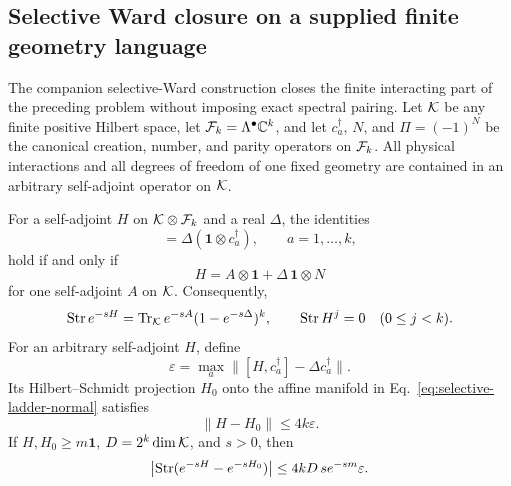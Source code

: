 \subsection{Selective Ward closure on a supplied finite geometry language}
\label{sec:selective-ward-closure}

The companion selective-Ward construction
\cite{XuSelectiveLadderWard2026} closes the finite interacting part of the
preceding problem without imposing exact spectral pairing.  Let
\(\mathcal K\) be any finite positive Hilbert space, let
\(\mathcal F_k=\Lambda^\bullet\mathbb C^k\), and let \(c_a^\dagger\), \(N\), and
\(\Pi=(-1)^N\) be the canonical creation, number, and parity operators on
\(\mathcal F_k\).  All physical interactions and all degrees of freedom of one
fixed geometry are contained in an arbitrary self-adjoint operator on
\(\mathcal K\).

\begin{theorem}
\label{thm:selective-ladder-closure}
For a self-adjoint \(H\) on \(\mathcal K\otimes\mathcal F_k\) and a real
\(\Delta\), the identities
\begin{equation}
 [H,\mathbf1\otimes c_a^\dagger]
 =\Delta(\mathbf1\otimes c_a^\dagger),
 \qquad a=1,\ldots,k,
 \label{eq:selective-ladder-ward}
\end{equation}
hold if and only if
\begin{equation}
 H=A\otimes\mathbf1+\Delta\,\mathbf1\otimes N
 \label{eq:selective-ladder-normal}
\end{equation}
for one self-adjoint \(A\) on \(\mathcal K\).  Consequently,
\begin{equation}
 \operatorname{Str} e^{-sH}=\operatorname{Tr}_\mathcal K e^{-sA}(1-e^{-s\Delta})^k,
 \qquad
 \operatorname{Str} H^j=0\quad(0\leq j<k).
 \label{eq:selective-heat}
\end{equation}
For an arbitrary self-adjoint \(H\), define
\[
 \varepsilon=\max_a
 \|[H,c_a^\dagger]-\Delta c_a^\dagger\|.
\]
Its Hilbert--Schmidt projection \(H_0\) onto the affine manifold
in Eq.~\eqref{eq:selective-ladder-normal} satisfies
\begin{equation}
 \|H-H_0\|\leq4k\varepsilon.
 \label{eq:selective-distance}
\end{equation}
If \(H,H_0\geq m\mathbf1\), \(D=2^k\dim\mathcal K\), and \(s>0\), then
\begin{equation}
 \left|\operatorname{Str}(e^{-sH}-e^{-sH_0})\right|
 \leq4kD\,s e^{-sm}\varepsilon .
 \label{eq:selective-heat-bound}
\end{equation}
\end{theorem}

